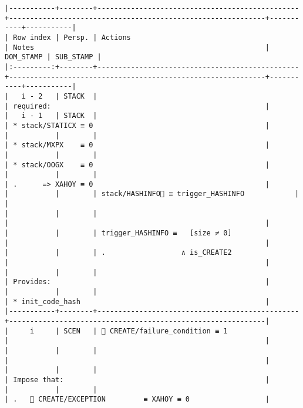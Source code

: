 \documentclass[varwidth=\maxdimen,margin=0.5cm,multi={verbatim}]{standalone}
\begin{document}
\begin{verbatim}
|-----------+--------+------------------------------------------------+-------------------------------------------------------------+-----------+-----------|
| Row index | Persp. | Actions                                        | Notes                                                       | DOM_STAMP | SUB_STAMP |
|:---------:+--------+------------------------------------------------+-------------------------------------------------------------+-----------+-----------|
|   i - 2   | STACK  |                                                | required:                                                   |
|   i - 1   | STACK  |                                                | * stack/STATICX ≡ 0                                         |
|           |        |                                                | * stack/MXPX    ≡ 0                                         |
|           |        |                                                | * stack/OOGX    ≡ 0                                         |
|           |        |                                                | .      => XAHOY ≡ 0                                         |
|           |        | stack/HASHINFO🚩 ≡ trigger_HASHINFO            |                                                             |
|           |        |                                                |                                                             |
|           |        | trigger_HASHINFO ≡   [size ≠ 0]                |                                                             |
|           |        | .                  ∧ is_CREATE2                |                                                             |
|           |        |                                                | Provides:                                                   |
|           |        |                                                | * init_code_hash                                            |
|-----------+--------+------------------------------------------------+-------------------------------------------------------------|
|     i     | SCEN   |  CREATE/failure_condition ≡ 1                 |                                                             |
|           |        |                                                |                                                             |
|           |        |                                                | Impose that:                                                |
|           |        |                                                | .    CREATE/EXCEPTION         ≡ XAHOY ≡ 0                  |

\end{verbatim}
\end{document}
